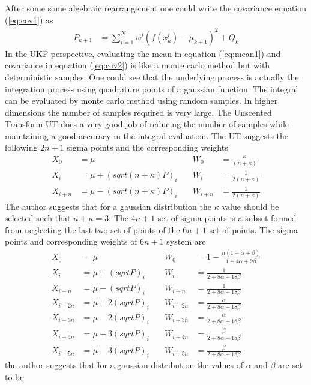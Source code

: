 \documentclass{article}
\begin{document}
	After some some algebraic rearrangement one could write the covariance equation (\ref{eq:cov1}) as
	\begin{align}
	P_{k+1}&=\sum_{i=1}^{N}w^i(f(x_k^i)-\mu_{k+1})^2+Q_k \label{eq:cov2}
	\end{align}
	 In the UKF perspective, evaluating the mean in equation (\ref{eq:mean1}) and covariance in equation (\ref{eq:cov2}) is like a monte carlo method but with deterministic samples. One could see that the underlying process is actually the integration process using quadrature points of a gaussian function. The integral can be evaluated by monte carlo method using random samples. In higher dimensions the number of samples required is very large. The Unscented Transform-UT does a very good job of reducing the number of samples while maintaining a good accuracy in the integral evaluation. The UT suggests the following $2n+1$ sigma points  and the corresponding weights
	 \begin{align}
	 X_0&=\mu \quad 														& W_0&=\frac{\kappa}{(n+\kappa)}\\
	 X_i&=\mu+(sqrt{(n+\kappa)P})_i\quad 			& W_i&=\frac{1}{2(n+\kappa)}\\
	 X_{i+n}&=\mu-(sqrt{(n+\kappa)P})_i\quad 	& W_{i+n}&=\frac{1}{2(n+\kappa)}
	 \end{align}
	 The author suggests that for a gaussian distribution the $\kappa$ value should be selected such that $n+\kappa=3$. 
	 The $4n+1$ set of sigma points  is a subset formed from neglecting the last two set of points of the $6n+1$ set of points. The sigma points and corresponding weights of $6n+1$ system are
	 \begin{align*}
	 X_0&=\mu  \quad                  & W_0&=1-\frac{n(1+\alpha+\beta)}{1+4\alpha+9\beta}\\
	 X_i&=\mu+(sqrt{P})_i \quad			 & W_i&=\frac{1}{2+8\alpha+18\beta}\\
	 X_{i+n}&=\mu-(sqrt{P})_i \quad   & W_{i+n}&=\frac{1}{2+8\alpha+18\beta}\\
	 X_{i+2n}&=\mu+2(sqrt{P})_i \quad & W_{i+2n}&=\frac{\alpha}{2+8\alpha+18\beta}\\
	 X_{i+3n}&=\mu-2(sqrt{P})_i \quad & W_{i+3n}&=\frac{\alpha}{2+8\alpha+18\beta}\\
	 X_{i+4n}&=\mu+3(sqrt{P})_i \quad & W_{i+4n}&=\frac{\beta}{2+8\alpha+18\beta}\\
	 X_{i+5n}&=\mu-3(sqrt{P})_i \quad & W_{i+5n}&=\frac{\beta}{2+8\alpha+18\beta}
	 \end{align*}
	 the author suggests that for a gaussian distribution the values of $\alpha$ and $\beta$ are set to be
\end{document}
